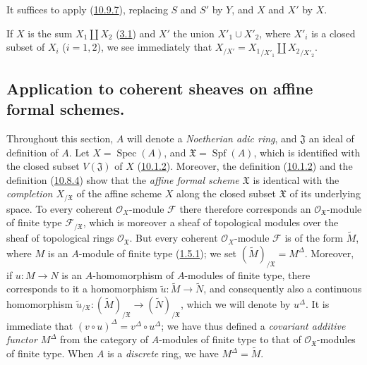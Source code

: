 It suffices to apply (\hyperref[I.10.9.7]{10.9.7}), replacing
$S$ and $S'$ by $Y$, and $X$ and $X'$ by $X$.

\begin{remark}[10.9.10]
\label{I.10.9.10}
If $X$ is the sum $X_1\amalg X_2$
(\hyperref[subsection:I.3.1]{3.1}) and $X'$ the union
$X'_1\cup X'_2$, where $X'_i$ is a closed subset of $X_i$ ($i=1,2$),
we see immediately that
$X_{/X'}={X_1}_{/X'_1}\amalg {X_2}_{/X'_2}$.
\end{remark}

\subsection{Application to coherent sheaves on affine formal
schemes.}
\label{subsection:I.10.10}

\begin{env}[10.10.1]
\label{I.10.10.1}
Throughout this section, $A$ will denote a \emph{Noetherian adic
ring}, and $\mathfrak{J}$ an ideal of definition of $A$. Let
$X=\operatorname{Spec}(A)$, and $\mathfrak{X}=\operatorname{Spf}(A)$,
which is identified with the closed subset $V(\mathfrak{J})$ of $X$
(\hyperref[I.10.1.2]{10.1.2}). Moreover, the definition
(\hyperref[I.10.1.2]{10.1.2}) and the definition
(\hyperref[I.10.8.4]{10.8.4}) show that the
\emph{affine formal scheme $\mathfrak{X}$} is identical with the
\emph{completion $X_{/\mathfrak{X}}$} of the affine scheme $X$ along the
closed subset $\mathfrak{X}$ of its underlying space. To every
coherent $\mathscr{O}_X$-module $\mathscr{F}$ there therefore corresponds
an $\mathscr{O}_{\mathfrak{X}}$-module of finite type
$\mathscr{F}_{/\mathfrak{X}}$, which is moreover a sheaf of topological
modules over the sheaf of topological rings
$\mathscr{O}_{\mathfrak{X}}$. But every coherent $\mathscr{O}_X$-module
$\mathscr{F}$ is of the form $\widetilde M$, where $M$ is an $A$-module
of finite type (\hyperref[I.1.5.1]{1.5.1}); we set
$(\widetilde M)_{/\mathfrak{X}}=M^\Delta$. Moreover, if $u:M\to N$ is
an $A$-homomorphism of $A$-modules of finite type, there corresponds to
it a homomorphism $\widetilde u:\widetilde M\to\widetilde N$, and
consequently also a continuous homomorphism
$\widetilde u_{/\mathfrak{X}}:(\widetilde M)_{/\mathfrak{X}}\to
(\widetilde N)_{/\mathfrak{X}}$, which we will denote by $u^\Delta$. It is
immediate that
$(v\circ u)^\Delta=v^\Delta\circ u^\Delta$; we have thus defined a
\emph{covariant additive functor $M^\Delta$} from the category of
$A$-modules of finite type to that of
$\mathscr{O}_{\mathfrak{X}}$-modules of finite type. When $A$ is a
\emph{discrete} ring, we have $M^\Delta=\widetilde M$.
\end{env}

